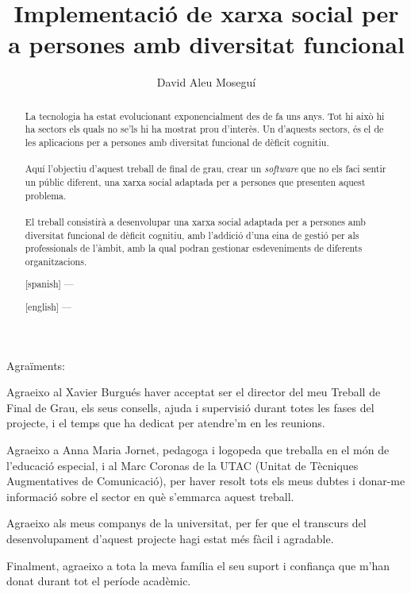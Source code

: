 \documentclass[11pt,catalan,listoffigures,listoftables]{tfgetsinf}
\title{Implementació de xarxa social per a persones amb diversitat funcional}
\author{David Aleu Moseguí}
\begin{document}
\begin{center}
\begin{LARGE}
Agraïments:
\end{LARGE}
\end{center}
\begin{center}
Agraeixo al Xavier Burgués haver acceptat ser el director del meu Treball de Final de Grau, els seus consells, ajuda i supervisió durant totes les fases del projecte, i el temps que ha dedicat per atendre'm en les reunions.
\end{center}
\begin{center}
Agraeixo a Anna Maria Jornet, pedagoga i logopeda que treballa en el món de l'educació especial, i al Marc Coronas de la UTAC (Unitat de Tècniques Augmentatives de Comunicació), per haver resolt tots els meus dubtes i donar-me informació sobre el sector en què s'emmarca aquest treball.
\end{center}
\begin{center}
Agraeixo als meus companys de la universitat, per fer que el transcurs del desenvolupament d'aquest projecte hagi estat més fàcil i agradable.
\end{center}
\begin{center}
Finalment, agraeixo a tota la meva família el seu suport i confiança que m'han donat durant tot el període acadèmic.
\end{center}
\clearpage
\begin{abstract}
\noindent La tecnologia ha estat evolucionant exponencialment des de fa uns anys. Tot hi això hi ha sectors els quals no se'ls hi ha mostrat prou d'interès. Un d'aquests sectors, és el de les aplicacions per a persones amb diversitat funcional de dèficit cognitiu.\\ \\
Aquí l'objectiu d'aquest treball de final de grau, crear un \textit{software} que no els faci sentir un públic diferent, una xarxa social adaptada per a persones que presenten aquest problema.\\ \\
El treball consistirà a desenvolupar una xarxa social adaptada per a persones amb diversitat funcional de dèficit cognitiu, amb l'addició d'una eina de gestió per als professionals de l'àmbit, amb la qual podran gestionar esdeveniments de diferents organitzacions.
\end{abstract}
\begin{abstract}[spanish]
---
\end{abstract}
\begin{abstract}[english]
---
\end{abstract}
\end{document}
